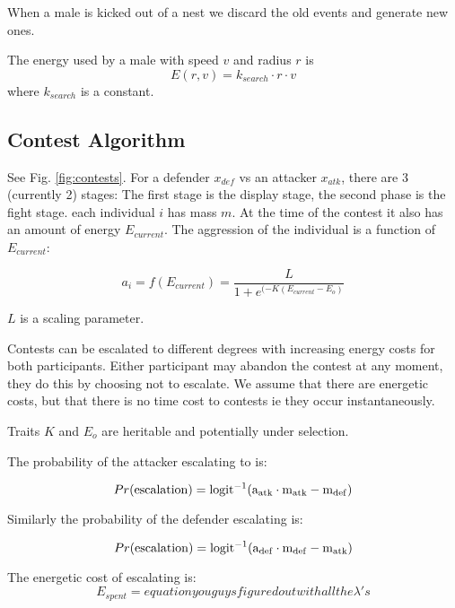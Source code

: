 \documentclass[a4paper,11pt]{article}
\begin{document}
When a male is kicked out of a nest we discard the old events and generate new ones.

The energy used by a male with speed $v$ and radius $r$ is 
\begin{equation}
    E(r,v) = k_{search} \cdot r \cdot v
\end{equation}
where $k_{search}$ is a constant.


\clearpage
\subsection{Contest Algorithm}
See Fig. \ref{fig:contests}.
For a defender $x_{def}$ vs an attacker $x_{atk}$, there are 3 (currently 2) stages:
The first stage is the display stage, the second phase is the fight stage.
each individual $i$ has mass $m$. At the time of the contest it also has an amount of energy $E_{current}$.  
The aggression of the individual is a function of $E_{current}$:

\begin{equation}\label{eq:aggression}
a_i = f(E_{current})=\frac{L}{1+e^{(-K(E_{current}-E_{o})}}
\end{equation}

$L$ is a scaling parameter.

Contests can be escalated to different degrees with increasing energy costs for both participants. 
Either participant may abandon the contest at any moment, they do this by choosing not to escalate.
We assume that there are energetic costs, but that there is no time cost to contests ie they occur instantaneously.

Traits $K$ and $E_{o}$ are heritable and potentially under selection.  

The probability of the attacker escalating to  is:

\begin{equation}\label{eq:attacker_escalating}
Pr(\rm{escalation}) =  logit^{-1}(a_{atk} \cdot m_{atk} - m_{def})
\end{equation}

Similarly the probability of the defender escalating is:

\begin{equation}\label{eq:defender_escalating}
          Pr(\rm{escalation}) =  logit^{-1}(a_{def} \cdot m_{def} - m_{atk})
\end{equation}


The energetic cost of escalating is:
\begin{equation}\label{eq:defender_escalating}
E_{spent}=equation you guys figured out with all the \lambda 's
\end{equation}
\end{document}
